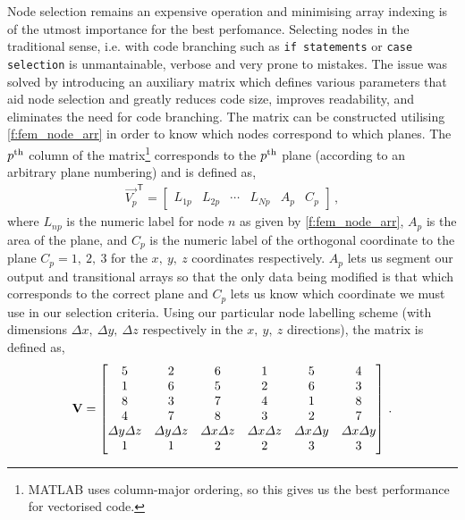 		Node selection remains an expensive operation and minimising array indexing is of the utmost importance for the best perfomance. Selecting nodes in the traditional sense, i.e. with code branching such as \texttt{if statements} or \texttt{case selection} is unmantainable, verbose and very prone to mistakes. The issue was solved by introducing an auxiliary matrix which defines various parameters that aid node selection and greatly reduces code size, improves readability, and eliminates the need for code branching. The matrix can be constructed utilising \cref{f:fem_node_arr} in order to know which nodes correspond to which  planes. The $ p\textsuperscript{th} $ column of the matrix\footnote{MATLAB uses column-major ordering, so this gives us the best performance for vectorised code.} corresponds to the $ p\textsuperscript{th} $ plane (according to an arbitrary plane numbering) and is defined as,
		\begin{align}\label{e:surf_node_util_vec}
			\vec{V_{p}}^{\mathsf{T}} =
				\begin{bmatrix}
					L_{1p} & L_{2p} & \cdots & L_{Np} & A_{p} & C_{p}
				\end{bmatrix}\,,
		\end{align}	
		where $ L_{np} $ is the numeric label for node $ n $ as given by \cref{f:fem_node_arr}, $ A_{p} $ is the area of the plane, and $ C_{p} $ is the numeric label of the orthogonal coordinate to the plane $ C_{p} = 1, ~2, ~3 $ for the $ x, ~y, ~z $ coordinates respectively. $ A_{p} $ lets us segment our output and transitional arrays so that the only data being modified is that which corresponds to the correct plane and $ C_{p} $ lets us know which coordinate we must use in our selection criteria. Using our particular node labelling scheme (with dimensions $ \Delta x,~ \Delta y,~ \Delta z $ respectively in the $ x,~ y,~ z $ directions), the matrix is defined as,
		\begin{align}\label{e:surf_node_util}
			\mathbf{V} = 
				\begin{bmatrix}
					5 & 2 & 6 & 1 & 5 & 4\\
					1 & 6 & 5 & 2 & 6 & 3\\
					8 & 3 & 7 & 4 & 1 & 8\\
					4 & 7 & 8 & 3 & 2 & 7\\
					\Delta y \Delta z & \Delta y \Delta z & \Delta x \Delta z & \Delta x \Delta z & \Delta x \Delta y & \Delta x \Delta y\\
					1 & 1 & 2 & 2 & 3 & 3
				\end{bmatrix}\,.
		\end{align}
